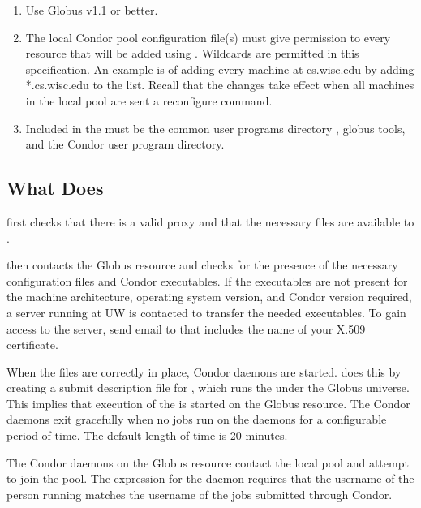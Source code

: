 \begin{enumerate}
\item Use Globus v1.1 or better.

\item The local Condor pool configuration file(s) must 
  give  permission
  to every resource that will be added using . 
  Wildcards are permitted in this specification.
  An example is of adding every machine at
  cs.wisc.edu by adding *.cs.wisc.edu to the
   list.
  Recall that the changes take effect when all machines
  in the local pool are sent a reconfigure command.

\item Included in the  must be the common user programs
  directory , globus tools, and the Condor user program
  directory.

\end{enumerate}

\subsection{What  Does}

 first checks that there is a valid proxy
and that the necessary files are available to .

 then contacts the Globus resource and checks for the
presence of the necessary configuration files and Condor executables.
If the executables are not present for the machine architecture,
operating system version, and Condor version required, a
server running at UW is contacted to transfer the needed executables.
To gain access to the server, send email to 
that includes the name of your X.509 certificate.

When the files are correctly in place,
Condor daemons are started.
 does this by creating a submit description file for
, which runs the  under the Globus
universe.
This implies that execution of the  is started on the Globus
resource.
The Condor daemons exit gracefully when no jobs run on the daemons for a
configurable period of time. The default length of time is 20 minutes.

The Condor daemons on the Globus resource contact the local pool and
attempt to join the pool.  The 
expression for the  daemon requires that the username
of the person running  matches the username of the jobs
submitted through Condor.

